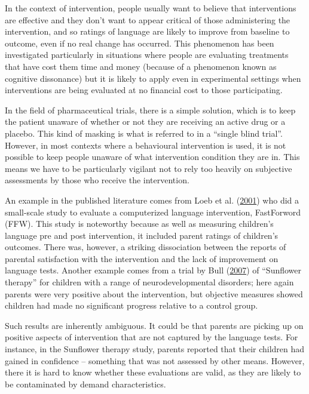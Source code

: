 \documentclass{krantz}
\begin{document}
In the context of intervention, people usually want to believe that interventions are effective and they don't want to appear critical of those administering the intervention, and so ratings of language are likely to improve from baseline to outcome, even if no real change has occurred. This phenomenon has been investigated particularly in situations where people are evaluating treatments that have cost them time and money (because of a phenomenon known as cognitive dissonance) but it is likely to apply even in experimental settings when interventions are being evaluated at no financial cost to those participating.

In the field of pharmaceutical trials, there is a simple solution, which is to keep the patient unaware of whether or not they are receiving an active drug or a placebo. This kind of masking is what is referred to in a ``single blind trial''. However, in most contexts where a behavioural intervention is used, it is not possible to keep people unaware of what intervention condition they are in. This means we have to be particularly vigilant not to rely too heavily on subjective assessments by those who receive the intervention.

An example in the published literature comes from Loeb et al. (\protect\hyperlink{ref-loeb2001}{2001}) who did a small-scale study to evaluate a computerized language intervention, FastForword (FFW). This study is noteworthy because as well as measuring children's language pre and post intervention, it included parent ratings of children's outcomes. There was, however, a striking dissociation between the reports of parental satisfaction with the intervention and the lack of improvement on language tests. Another example comes from a trial by Bull (\protect\hyperlink{ref-bull2007}{2007}) of ``Sunflower therapy'' for children with a range of neurodevelopmental disorders; here again parents were very positive about the intervention, but objective measures showed children had made no significant progress relative to a control group.

Such results are inherently ambiguous. It could be that parents are picking up on positive aspects of intervention that are not captured by the language tests. For instance, in the Sunflower therapy study, parents reported that their children had gained in confidence -- something that was not assessed by other means. However, there it is hard to know whether these evaluations are valid, as they are likely to be contaminated by demand characteristics.
\end{document}
